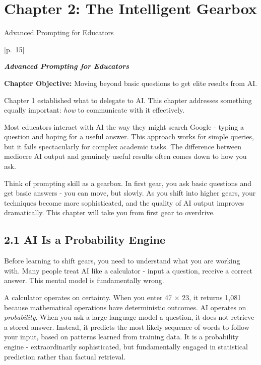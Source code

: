 \documentclass[
  letterpaper,
  DIV=11,
  numbers=noendperiod]{scrreprt}
\begin{document}

\chapter{Chapter 2: The Intelligent
Gearbox}\label{chapter-2-the-intelligent-gearbox}

Advanced Prompting for Educators

\hfill\break

{[}p.~15{]}

\textbf{\emph{Advanced Prompting for Educators}}

\textbf{Chapter Objective:} Moving beyond basic questions to get elite
results from AI.

Chapter 1 established what to delegate to AI. This chapter addresses
something equally important: \emph{how} to communicate with it
effectively.

Most educators interact with AI the way they might search Google -
typing a question and hoping for a useful answer. This approach works
for simple queries, but it fails spectacularly for complex academic
tasks. The difference between mediocre AI output and genuinely useful
results often comes down to how you ask.

Think of prompting skill as a gearbox. In first gear, you ask basic
questions and get basic answers - you can move, but slowly. As you shift
into higher gears, your techniques become more sophisticated, and the
quality of AI output improves dramatically. This chapter will take you
from first gear to overdrive.

\section{2.1 AI Is a Probability
Engine}\label{ai-is-a-probability-engine}

Before learning to shift gears, you need to understand what you are
working with. Many people treat AI like a calculator - input a question,
receive a correct answer. This mental model is fundamentally wrong.

A calculator operates on certainty. When you enter 47 × 23, it returns
1,081 because mathematical operations have deterministic outcomes. AI
operates on \emph{probability}. When you ask a large language model a
question, it does not retrieve a stored answer. Instead, it predicts the
most likely sequence of words to follow your input, based on patterns
learned from training data. It is a probability engine - extraordinarily
sophisticated, but fundamentally engaged in statistical prediction
rather than factual retrieval.
\end{document}
